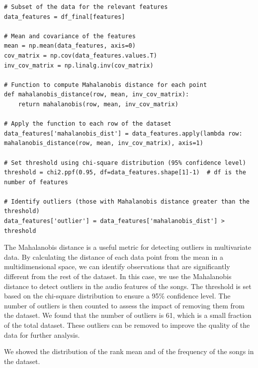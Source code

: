 \begin{verbatim}
# Subset of the data for the relevant features
data_features = df_final[features]

# Mean and covariance of the features
mean = np.mean(data_features, axis=0)
cov_matrix = np.cov(data_features.values.T)
inv_cov_matrix = np.linalg.inv(cov_matrix)

# Function to compute Mahalanobis distance for each point
def mahalanobis_distance(row, mean, inv_cov_matrix):
    return mahalanobis(row, mean, inv_cov_matrix)

# Apply the function to each row of the dataset
data_features['mahalanobis_dist'] = data_features.apply(lambda row: mahalanobis_distance(row, mean, inv_cov_matrix), axis=1)

# Set threshold using chi-square distribution (95% confidence level)
threshold = chi2.ppf(0.95, df=data_features.shape[1]-1)  # df is the number of features

# Identify outliers (those with Mahalanobis distance greater than the threshold)
data_features['outlier'] = data_features['mahalanobis_dist'] > threshold

\end{verbatim}

The Mahalanobis distance is a useful metric for detecting outliers in multivariate data. By calculating the distance of each data point from the mean in a multidimensional space, we can identify observations that are significantly different from the rest of the dataset. In this case, we use the Mahalanobis distance to detect outliers in the audio features of the songs. The threshold is set based on the chi-square distribution to ensure a 95\% confidence level. The number of outliers is then counted to assess the impact of removing them from the dataset.
We found that the number of outliers is 61, which is a small fraction of the total dataset. These outliers can be removed to improve the quality of the data for further analysis.


We showed the distribution of the rank mean and of the frequency of the songs in the dataset.

